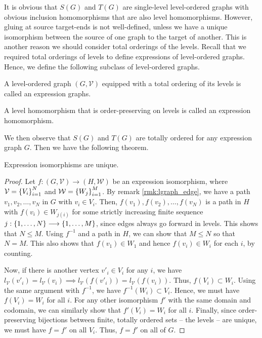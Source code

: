 \documentclass[./Thick_TQFTs_and_Quantum_Information.tex]{subfiles}
\begin{document}
It is obvious that $S(G)$ and $T(G)$ are single-level level-ordered graphs with
obvious inclusion homomorphisms that are also level homomorphisms. However,
gluing at source target-ends is not well-defined, unless we have a unique
isomorphism between the source of one graph to the target of another. This is
another reason we should consider total orderings of the levels. Recall that we
required total orderings of levels to define expressions of level-ordered
graphs. Hence, we define the following subclass of level-ordered graphs.

\begin{defn}
A level-ordered graph $(G, \mathcal{V})$ equipped with a total ordering of its
levels is called an expression graphs.
\end{defn}

\begin{defn}
A level homomorphism that is order-preserving on levels is called an expression
homomorphism.
\end{defn}

We then observe that $S(G)$ and $T(G)$ are totally ordered for any expression
graph $G$. Then we have the following theorem.

\begin{thm}\label{thm:expiso_unique}
Expression isomorphisms are unique.
\end{thm}
\begin{proof}
Let $f : (G, \mathcal{V}) \to (H, \mathcal{W})$ be an expression isomorphism,
where $\mathcal{V} = \set{V_i}_{i = 1}^{N}$ and
$\mathcal{W} = \set{W_j}_{i = 1}^{M}$. By remark \ref{rmk:lgraph_edge}, we have
a path $v_1, v_2, \dots, v_N$ in $G$ with $v_i \in V_i$. Then,
$f(v_1), f(v_2), \dots, f(v_N)$ is a path in $H$ with $f(v_i) \in W_{j(i)}$
for some strictly increasing finite sequence
$j : \set{1, \dots, N} \to \set{1, \dots, M}$, since edges always go forward in
levels. This shows that $N \leq M$. Using $f^{-1}$ and a path in $H$, we can
show that $M \leq N$ so that $N = M$. This also shows that $f(v_1) \in W_1$ and
hence $f(v_i) \in W_i$ for each $i$, by counting.

Now, if there is another vertex $v'_i \in V_i$ for any $i$, we have
$l_{\mathcal{V}}(v'_i) = l_{\mathcal{V}}(v_i) \implies
l_{\mathcal{V}}(f(v'_i)) = l_{\mathcal{V}}(f(v_i))$. Thus, $f(V_i) \subset W_i$.
Using the same argument with $f^{-1}$, we have $f^{-1}(W_i) \subset V_i$. Hence,
we must have $f(V_i) = W_i$ for all $i$. For any other isomorphism $f'$ with the
same domain and codomain, we can similarly show that $f'(V_i) = W_i$ for all
$i$. Finally, since order-preserving bijections between finite, totally ordered
sets -- the levels -- are unique, we must have $f = f'$ on all $V_i$. Thus,
$f = f'$ on all of $G$.
\end{proof}
\end{document}
